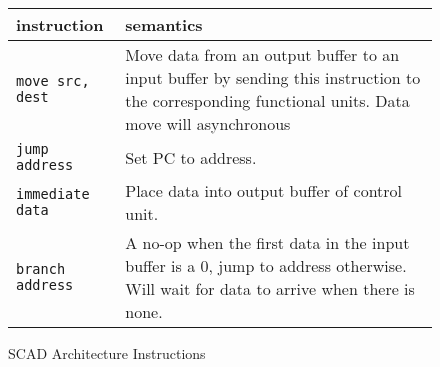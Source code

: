 		
		\begin{figure}[!ht]
			\begin{center}
				\begin{tabular}{| l | p{8cm} |}
					\hline
					\textbf{instruction} & \textbf{semantics} \\ \hline
					\lstinline{move src, dest} & Move data from an output buffer to an input buffer by sending this instruction to the corresponding functional units. Data move will asynchronous \\ \hline
					\lstinline{jump address} & Set PC to address. \\ \hline
					\lstinline{immediate data} & Place data into output buffer of control unit. \\ \hline
					\lstinline{branch address} & A no-op when the first data in the input buffer is a 0, jump to address otherwise. Will wait for data to arrive when there is none. \\ \hline
				\end{tabular}
				\label{fig:instruction_table}
				\caption{SCAD Architecture Instructions}
			\end{center}
		\end{figure}

